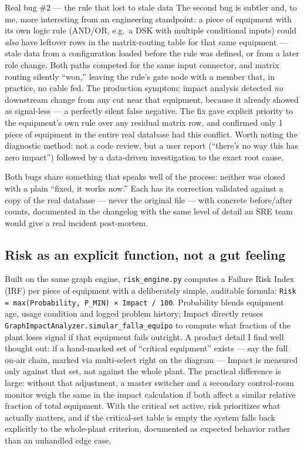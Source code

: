 \documentclass[10.4pt,twocolumn]{article}
\begin{document}
\begin{bugbox}{Real bug \#2 --- the rule that lost to stale data}
The second bug is subtler and, to me, more interesting from an engineering standpoint: a piece of equipment with its own logic rule (AND/OR, e.g.\ a DSK with multiple conditional inputs) could \emph{also} have leftover rows in the matrix-routing table for that same equipment --- stale data from a configuration loaded before the rule was defined, or from a later role change. Both paths competed for the same input connector, and matrix routing silently ``won,'' leaving the rule's gate node with a member that, in practice, no cable fed. The production symptom: impact analysis detected \emph{no} downstream change from any cut near that equipment, because it already showed as signal-less --- a perfectly silent false negative. The fix gave explicit priority to the equipment's own rule over any residual matrix row, and confirmed only 1 piece of equipment in the entire real database had this conflict. Worth noting the diagnostic method: not a code review, but a user report (``there's no way this has zero impact'') followed by a data-driven investigation to the exact root cause.
\end{bugbox}

Both bugs share something that speaks well of the process: neither was closed with a plain ``fixed, it works now.'' Each has its correction validated against a copy of the real database --- never the original file --- with concrete before/after counts, documented in the changelog with the same level of detail an SRE team would give a real incident post-mortem.

\subsection{Risk as an explicit function, not a gut feeling}

Built on the same graph engine, \texttt{risk\_engine.py} computes a Failure Risk Index (IRF) per piece of equipment with a deliberately simple, auditable formula: \texttt{Risk = max(Probability, P\_MIN) × Impact / 100}. Probability blends equipment age, usage condition and logged problem history; Impact directly reuses \texttt{GraphImpactAnalyzer.simular\_falla\_equipo} to compute what fraction of the plant loses signal if that equipment fails outright. A product detail I find well thought out: if a hand-marked set of ``critical equipment'' exists --- say the full on-air chain, marked via multi-select right on the diagram --- Impact is measured only against that set, not against the whole plant. The practical difference is large: without that adjustment, a master switcher and a secondary control-room monitor weigh the same in the impact calculation if both affect a similar relative fraction of total equipment. With the critical set active, risk prioritizes what actually matters, and if the critical-set table is empty the system falls back explicitly to the whole-plant criterion, documented as expected behavior rather than an unhandled edge case.
\end{document}
